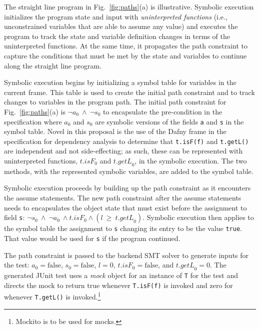 \documentclass[11pt,onecolumn,notitlepage]{article}
\newcommand{\figref}[1]{Fig.~\ref{#1}}
\begin{document}
The straight line program in \figref{fig:paths}(a) is illustrative. Symbolic execution initializes the program state and input with \emph{uninterpreted functions} (i.e., unconstrained variables that are able to assume any value) and executes the program to track the state and variable definition changes in terms of the uninterpreted functions. At the same time, it propagates the path constraint to capture the conditions that must be met by the state and variables to continue along the straight line program.

Symbolic execution begins by initializing a symbol table for variables in the current frame. This table is used to create the initial path constraint and to track changes to variables in the program path. The initial path constraint for \figref{fig:paths}(a) is $\neg a_0\ \wedge\ \neg s_0$ to encapsulate the pre-condition in the specification where $a_0$ and $s_0$ are symbolic versions of the fields \texttt{a} and \texttt{s} in the symbol table. Novel in this proposal is the use of the Dafny frame in the specification for dependency analysis to determine that \texttt{t.isF(f)} and \texttt{t.getL()} are independent and not side-effecting; as such, these can be represented with uninterpreted functions, $\mathit{t.isF}_0$ and $\mathit{t.getL}_0$, in the symbolic execution. The two methods, with the represented symbolic variables, are added to the symbol table.

Symbolic execution proceeds by building up the path constraint as it encounters the assume statements. The new path constraint after the assume statements needs to encapsulates the object state that must exist before the assignment to field \texttt{s}: $\neg s_0\ \wedge\ \neg a_0\ \wedge \mathit{t.isF}_0 \wedge (l\ \ge\ \mathit{t.getL}_0)$. Symbolic execution then applies to the symbol table the assignment to \texttt{s} changing its entry to be the value \texttt{true}. That value would be used for \texttt{s} if the program continued.

The path constraint is passed to the backend SMT solver to generate inputs for the test: $a_0 = \mathrm{false}$, $s_0 = \mathrm{false}$, $\mathit{l} = 0$, $\mathit{t.isF}_0 = \mathrm{false}$, and $\mathit{t.getL}_0 = 0$. The generated JUnit test uses a \emph{mock} object for an instance of \texttt{T} for the test and directs the mock to return true whenever \texttt{T.isF(f)} is invoked and zero for whenever \texttt{T.getL()} is invoked.\footnote{Mockito is to be used for mocks.} 
\end{document}
